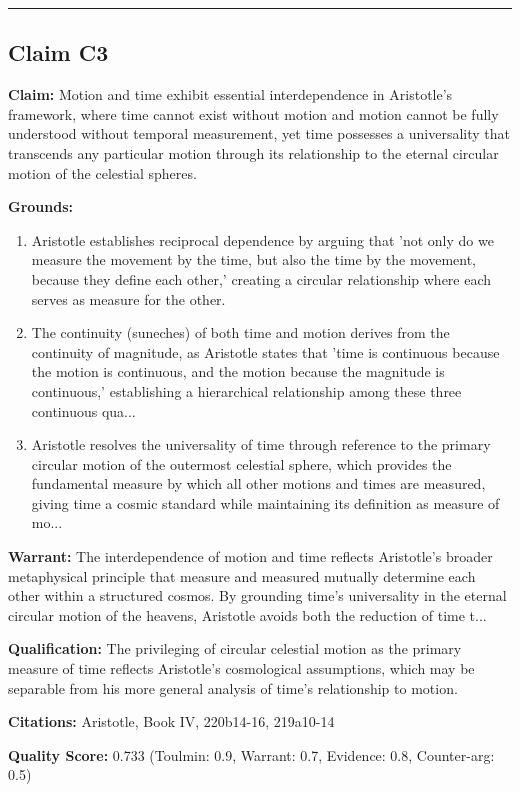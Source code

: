 \documentclass[12pt,a4paper]{article}
\begin{document}
\medskip\hrule\medskip

\subsection*{Claim C3}

\textbf{Claim:} Motion and time exhibit essential interdependence in Aristotle's framework, where time cannot exist without motion and motion cannot be fully understood without temporal measurement, yet time possesses a universality that transcends any particular motion through its relationship to the eternal circular motion of the celestial spheres.

\textbf{Grounds:}
\begin{enumerate}[nosep]
\item Aristotle establishes reciprocal dependence by arguing that 'not only do we measure the movement by the time, but also the time by the movement, because they define each other,' creating a circular relationship where each serves as measure for the other.
\item The continuity (suneches) of both time and motion derives from the continuity of magnitude, as Aristotle states that 'time is continuous because the motion is continuous, and the motion because the magnitude is continuous,' establishing a hierarchical relationship among these three continuous qua...
\item Aristotle resolves the universality of time through reference to the primary circular motion of the outermost celestial sphere, which provides the fundamental measure by which all other motions and times are measured, giving time a cosmic standard while maintaining its definition as measure of mo...
\end{enumerate}

\textbf{Warrant:} The interdependence of motion and time reflects Aristotle's broader metaphysical principle that measure and measured mutually determine each other within a structured cosmos. By grounding time's universality in the eternal circular motion of the heavens, Aristotle avoids both the reduction of time t...

\textbf{Qualification:} The privileging of circular celestial motion as the primary measure of time reflects Aristotle's cosmological assumptions, which may be separable from his more general analysis of time's relationship to motion.

\textbf{Citations:} Aristotle, Book IV, 220b14-16, 219a10-14

\textbf{Quality Score:} 0.733 (Toulmin: 0.9, Warrant: 0.7, Evidence: 0.8, Counter-arg: 0.5)
\end{document}
